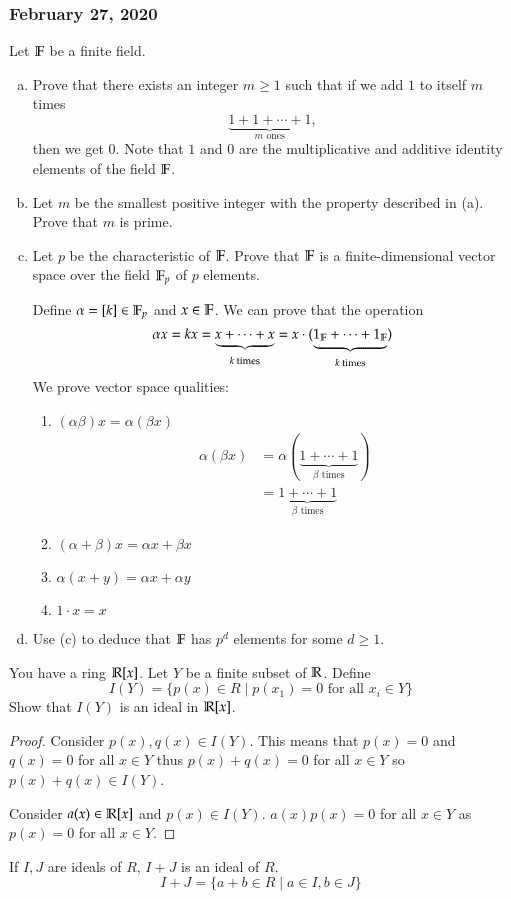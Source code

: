 \subsubsection*{February 27, 2020}
\exercise Let $\mathbb{F}$ be a finite field. 

\begin{enumerate}[(a)]
	\item Prove that there exists an integer $m\geq 1$ such that if we add $1$ to itself $m$ times
	\[\underbrace{1+1+\cdots +1}_{\text{$m$ ones}},\]
	then we get $0$. Note that $1$ and $0$ are the multiplicative and additive identity elements of the field $\mathbb{F}$. 
	
	\item Let $m$ be the smallest positive integer with the property described in (a). Prove that $m$ is prime. 
	\item Let $p$ be the characteristic of $\mathbb{F}$. Prove that $\mathbb{F}$ is a finite-dimensional vector space over the field $\mathbb{F}_p$ of $p$ elements. 
	
	Define $\alpha=[k]\in \mathbb{F}_p$ and $x\in \mathbb{F}$. We can prove that the operation
	\[\alpha x = kx = \underbrace{x+\cdots+x}_{\text{$k$ times}} = x\cdot(\underbrace{1_{\mathbb{F}}+\cdots+1_{\mathbb{F}}}_{\text{$k$ times}})\]
	We prove vector space qualities: 
	\begin{enumerate}[1.]
		\item $(\alpha\beta)x = \alpha(\beta x)$
		\begin{align*}
			\alpha(\beta x) &= \alpha(\underbrace{1 + \cdots + 1}_{\text{$\beta$ times}}) \\
			&= \underbrace{1 + \cdots + 1}_{\text{$\beta$ times}}
		\end{align*}
		\item $(\alpha + \beta)x = \alpha x + \beta x$
		\item $\alpha(x + y) = \alpha x + \alpha y$
		\item $1\cdot x = x$
	\end{enumerate}
	
	\item Use (c) to deduce that $\mathbb{F}$ has $p^d$ elements for some $d\geq 1$. 
\end{enumerate}

\exercise You have a ring $\mathbb{R}[x]$. Let $Y$ be a finite subset of $\mathbb{R}$. Define
\[I(Y)=\{p(x)\in R\mid p(x_1)=0 \text{ for all }x_i\in Y\}\]
Show that $I(Y)$ is an ideal in $\mathbb{R}[x]$. 
\begin{proof}
	Consider $p(x), q(x)\in I(Y)$. This means that $p(x)=0$ and $q(x)=0$ for all $x\in Y$ thus $p(x) + q(x) = 0$ for all $x\in Y$ so $p(x) + q(x)\in I(Y)$. 
	
	Consider $a(x) \in \mathbb{R}[x]$ and $p(x)\in I(Y)$. $a(x)p(x)=0$ for all $x\in Y$ as $p(x)=0$ for all $x\in Y$. 
\end{proof}

\exercise If $I,J$ are ideals of $R$, $I+J$ is an ideal of $R$. 
\[I+J=\{a+b\in R\mid a\in I, b\in J\}\]

